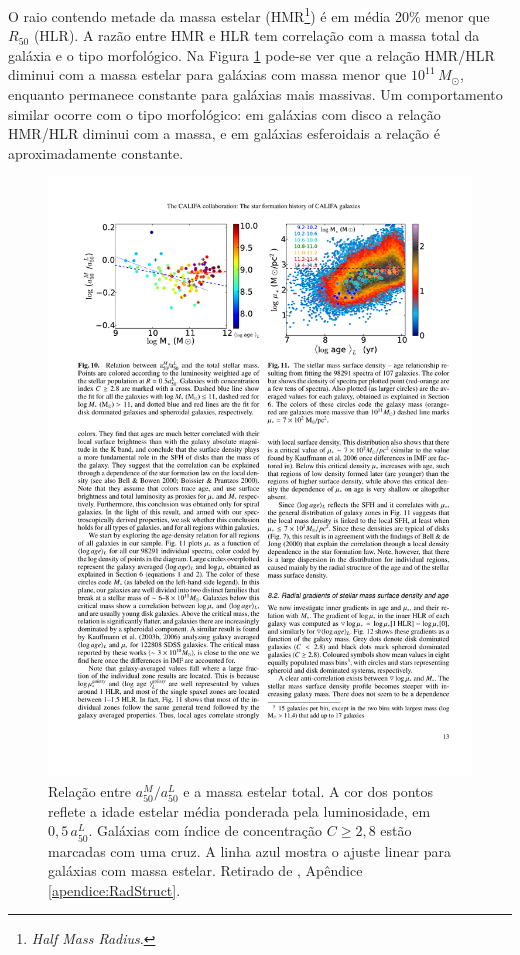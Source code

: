 O raio contendo metade da massa estelar (HMR\footnote{{\em Half Mass Radius}.})
é em média 20\% menor que $R_{50}$ (HLR). A razão entre HMR e HLR tem correlação
com a massa total da galáxia e o tipo morfológico. Na Figura
\ref{fig:radStruct2} pode-se ver que a relação HMR/HLR diminui com a massa
estelar para galáxias com massa menor que $10^{11}\,M_\odot$, enquanto permanece
constante para galáxias mais massivas. Um comportamento similar ocorre com o
tipo morfológico:
em galáxias com disco a relação HMR/HLR diminui com a massa, e em galáxias
esferoidais a relação é aproximadamente constante.

\begin{figure}
	\includegraphics{figuras/radstruct-02}
	\caption[Relação entre $a^M_{50}/a^L_{50}$ e a massa estelar total]
	{Relação entre $a^M_{50}/a^L_{50}$ e a massa estelar total. A cor dos
	pontos reflete a idade estelar média ponderada pela luminosidade, em $0,5\,a^L_{50}$.
	Galáxias com índice de concentração $C \geq 2,8$ estão marcadas com uma cruz. A
	linha azul mostra o ajuste linear para galáxias com massa estelar. Retirado de
	\citet[figura 10]{GonzalezDelgado2014a}, Apêndice
	\ref{apendice:RadStruct}.}
	\label{fig:radStruct2}
\end{figure}

